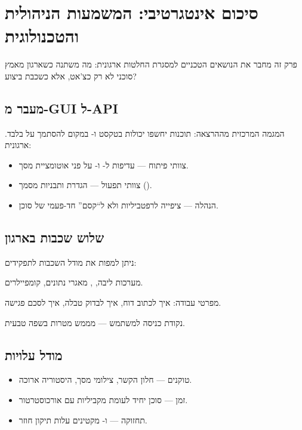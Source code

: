 \section{סיכום אינטגרטיבי: המשמעות הניהולית והטכנולוגית}

פרק זה מחבר את הנושאים הטכניים למסגרת החלטות ארגונית: מה משתנה כשארגון
מאמץ סוכני  לא רק כצ'אט, אלא כשכבת ביצוע?

\subsection{מעבר מ-GUI ל-API}

המגמה המרכזית מההרצאה: תוכנות יחשפו יכולות בטקסט ו- במקום
להסתמך על  בלבד. ארגונית:
\begin{itemize}[rightmargin=2em]
  \item צוותי פיתוח --- עדיפות ל- ו- על פני אוטומציית מסך.
  \item צוותי תפעול --- הגדרת  ותבניות מסמך ().
  \item הנהלה --- ציפייה לרפטביליות ולא ל``קסם'' חד-פעמי של סוכן.
\end{itemize}

\subsection{שלוש שכבות בארגון}

ניתן למפות את מודל השכבות לתפקידים:
\begin{description}[rightmargin=2em, style=nextline]
  \item[Software] מערכות ליבה, , מאגרי נתונים, קומפיילרים.
  \item[Skill] מפרטי עבודה: איך לכתוב דוח, איך לבדוק טבלה, איך לסכם פגישה.
  \item[Agent] נקודת כניסה למשתמש --- מממש מטרות בשפה טבעית.
\end{description}

\subsection{מודל עלויות}

\begin{itemize}[rightmargin=2em]
  \item טוקנים --- חלון הקשר, צילומי מסך, היסטוריה ארוכה.
  \item זמן --- סוכן יחיד לעומת מקביליות עם אורכוסטרטור.
  \item תחזוקה ---  ו- מקטינים עלות תיקון חוזר.
\end{itemize}

